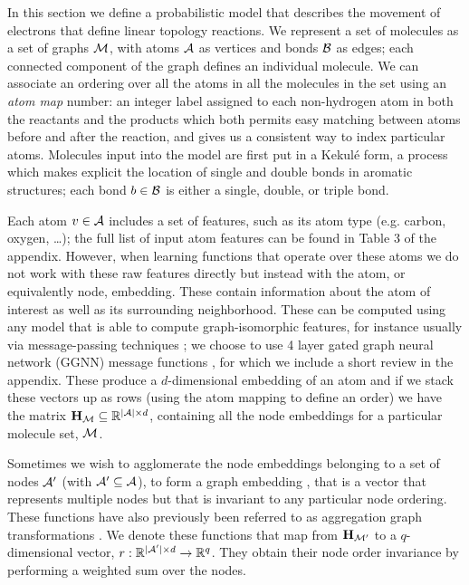 


In this section we define a probabilistic model that describes the movement of electrons that define linear topology reactions.
We represent a set of molecules as a set of graphs ${\mathcal{M}}$, with atoms ${\mathcal{A}}$ as vertices and bonds ${\mathcal{B}}$ as edges;
each connected component of the graph defines an individual molecule.
We can associate an ordering over all the atoms in all the molecules in the set using an {\em atom map} number:
an integer label assigned to each non-hydrogen atom in both the reactants and the products which 
both permits easy matching between atoms before and after the reaction, and
gives us a consistent way to index particular atoms. Molecules input into the model are first put in a Kekul\'e form, a process which makes explicit the location of single and double bonds in aromatic structures;
each bond $b \in {\mathcal{B}}$ is either a single, double, or triple bond.

Each atom $v \in {\mathcal{A}}$ includes a set of features, such as its atom type (e.g. carbon, oxygen, \dots); the full list of input atom features can be found in Table 3 of the appendix.
 However, when learning functions that operate over these atoms we do not work with these raw features directly but instead with the atom, or equivalently node, embedding. 
 These contain information about the atom of interest as well as its surrounding neighborhood.
 These can be computed using any model that is able to compute graph-isomorphic features, for instance usually via message-passing techniques \citep{gilmer2017neural}; we choose to use 4 layer gated graph neural network (GGNN) message functions \citep{li2016gated}, for which we include a short review in the appendix. 
 These produce a $d$-dimensional embedding of an atom and if we stack these vectors up as rows (using the atom mapping to define an order)  we have the matrix ${\mathbf{H}}_{{\mathcal{M}}} \subseteq \mathbb{R}^{|{\mathcal{A}}|\times d}$, containing all the node embeddings for a particular molecule set, ${\mathcal{M}}$.

Sometimes we wish to agglomerate the node embeddings belonging to a set of nodes ${\mathcal{A}}'$ (with ${\mathcal{A}}' \subseteq  {\mathcal{A}}$), to form a graph embedding \citet[\S B.1]{li2018learning}, that is a vector that represents multiple nodes but that is invariant to any particular node ordering. 
These functions have also previously been referred to as aggregation graph transformations \citep[\S3]{Johnson2017-pd}.
We denote these functions that map from ${\mathbf{H}}_{{\mathcal{M}}'}$ to a $q$-dimensional vector, $r: \mathbb{R}^{|{\mathcal{A}}'|\times d} \to \mathbb{R}^q$.
They obtain their node order invariance by performing a weighted sum over the nodes.


